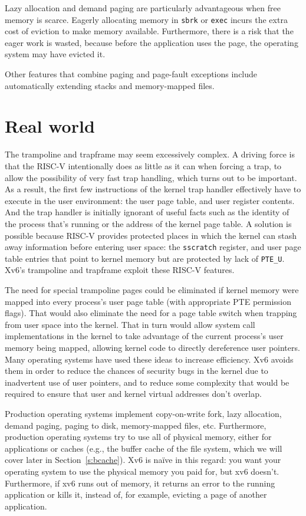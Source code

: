 Lazy allocation and demand paging are particularly advantageous when
free memory is scarce.
Eagerly allocating memory in
\lstinline{sbrk} or \lstinline{exec}
incurs the extra cost of eviction to make memory available.
Furthermore, there is a risk that the eager work is wasted, because
before the application uses the page, the operating system may have
evicted it.

Other features that combine paging and page-fault exceptions include
automatically extending stacks and memory-mapped files.

\section{Real world}

The trampoline and trapframe may seem excessively complex. A driving
force is that the RISC-V intentionally does as little as it can when
forcing a trap, to allow the possibility of very fast trap handling,
which turns out to be important. As a result, the first few
instructions of the kernel trap handler effectively have to execute in
the user environment: the user page table, and user register contents.
And the trap handler is initially ignorant of useful facts such as the
identity of the process that's running or the address of the kernel
page table. A solution is possible because RISC-V provides protected
places in which the kernel can stash away information before entering
user space: the {\tt sscratch} register, and user page table entries
that point to kernel memory but are protected by lack of \lstinline{PTE_U}.
Xv6's trampoline and trapframe exploit these RISC-V features.

The need for special trampoline pages could be eliminated if kernel
memory were mapped into every process's user page table (with
appropriate PTE permission flags). That would
also eliminate the need for a page table switch when trapping from
user space into the kernel. That in turn would allow system call
implementations in the kernel to take advantage of the current
process's user memory being mapped, allowing kernel code to directly
dereference user pointers. Many operating systems have used these ideas to
increase efficiency. Xv6 avoids them in order to reduce the chances of
security bugs in the kernel due to inadvertent use of user pointers,
and to reduce some complexity that would be required to ensure that
user and kernel virtual addresses don't overlap.

Production operating systems implement copy-on-write fork, lazy
allocation, demand paging, paging to disk, memory-mapped files, etc.
Furthermore, production operating systems try to use all of
physical memory, either for applications or caches (e.g., the buffer
cache of the file system, which we will cover later in
Section~\ref{s:bcache}). Xv6 is na\"{i}ve in this regard: you want
your operating system to use the physical memory you paid for, but xv6
doesn't. Furthermore, if xv6 runs out of memory, it returns an error to
the running application or kills it, instead of, for example, evicting
a page of another application.

